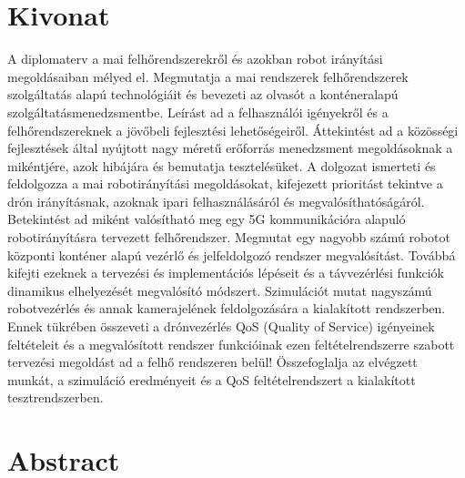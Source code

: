 \setcounter{page}{1}

\selecthungarian

\chapter*{Kivonat}

A diplomaterv a mai felhőrendszerekről és azokban robot irányítási megoldásaiban mélyed el.
Megmutatja a mai rendszerek felhőrendszerek szolgáltatás alapú technológiáit és bevezeti az olvasót a konténeralapú szolgáltatásmenedzsmentbe. Leírást ad a felhasználói igényekről és a felhőrendszereknek a jövőbeli fejlesztési lehetőségeiről. Áttekintést ad a közösségi fejlesztések által nyújtott nagy méretű erőforrás menedzsment megoldásoknak a mikéntjére, azok hibájára és bemutatja tesztelésüket. A dolgozat ismerteti és feldolgozza a mai robotirányítási megoldásokat, kifejezett prioritást tekintve a drón irányításnak, azoknak ipari felhasználásáról és megvalósíthatóságáról. Betekintést ad miként valósítható meg egy 5G kommunikációra alapuló robotirányításra tervezett felhőrendszer. Megmutat egy nagyobb számú robotot központi konténer alapú vezérlő és jelfeldolgozó rendszer megvalósítást. Továbbá kifejti ezeknek a tervezési és implementációs lépéseit és a távvezérlési funkciók dinamikus elhelyezését megvalósító módszert. Szimulációt mutat nagyszámú robotvezérlés és annak kamerajelének feldolgozására a kialakított rendszerben. Ennek tükrében összeveti a drónvezérlés QoS (Quality of Service) igényeinek feltételeit és a megvalósított rendszer funkcióinak ezen feltételrendszerre szabott tervezési megoldást ad a felhő rendszeren belül!
Összefoglalja az elvégzett munkát, a szimuláció eredményeit és a QoS feltételrendszert a kialakított tesztrendszerben.


\vfill
\selectenglish


\chapter*{Abstract}

